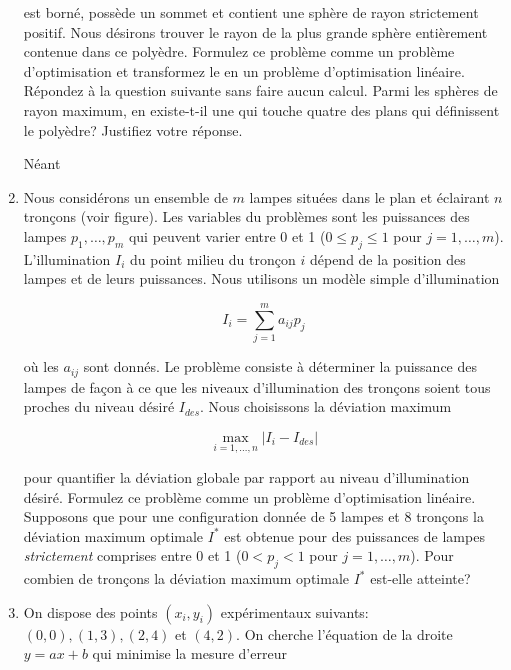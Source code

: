 \begin{enumerate}
    est borné, possède un sommet et contient une sphère de rayon strictement positif. Nous désirons trouver le rayon de la plus grande
    sphère entièrement contenue dans ce poly\`edre. Formulez ce problème comme un problème d'optimisation et transformez le en un
    problème d'optimisation linéaire.  Répondez à la question suivante sans faire aucun calcul. Parmi les sphères de rayon
    maximum, en existe-t-il une qui touche quatre des plans qui définissent le poly\`edre? Justifiez votre réponse.






    \begin{solution}
      Néant
    \end{solution}

  \item Nous considérons un ensemble de $m$ lampes situées dans le  plan et éclairant $n$
    tronçons (voir figure).  Les variables du problèmes sont les puissances des lampes $p_1, \ldots, p_m$ qui peuvent varier entre 0 et 1 ($0 \leq p_j \leq 1$ pour
    $j=1, \ldots, m$).  L'illumination $I_i$ du point milieu du tronçon $i$ dépend de la position des lampes et de leurs
    puissances. Nous utilisons un modèle simple d'illumination

    $$I_i = \sum_{j=1}^m a_{ij} p_j$$

    où les $a_{ij}$ sont donnés. Le problème consiste à déterminer la puissance des lampes de façon à ce que les niveaux d'illumination des
    tronçons soient tous proches du niveau désiré $I_{des}$. Nous choisissons la déviation maximum

    $$\max_{i=1, \ldots, n} | I_i -I_{des}|$$

    pour quantifier la déviation globale par rapport au niveau d'illumination désiré.  Formulez ce problème comme un problème d'optimisation linéaire. Supposons
    que pour une configuration donnée de 5 lampes et 8 tronçons la déviation maximum optimale  $I^*$ est obtenue pour des puissances de lampes {\it
    strictement}  comprises entre 0 et 1 ($0 < p_j < 1$ pour $j=1, \ldots, m$). Pour combien de tronçons la déviation maximum optimale $I^*$ est-elle atteinte?





    \begin{solution}
      \nosolution
    \end{solution}

  \item On dispose des points $(x_i, y_i)$ expérimentaux suivants: $(0, 0), (1, 3), (2, 4)$ et $(4, 2)$. On cherche l'équation de la
    droite $y=ax+b$ qui minimise la mesure d'erreur


\end{enumerate}
